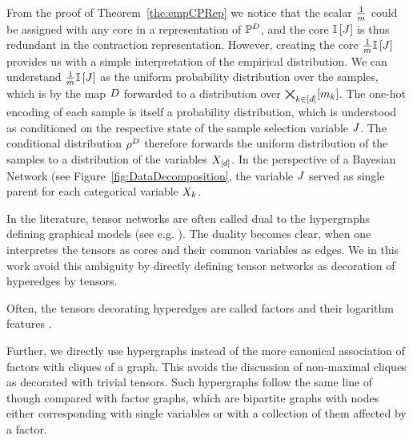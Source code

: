 From the proof of Theorem~\ref{the:empCPRep} we notice that the scalar $\frac{1}{m}$ could be assigned with any core in a representation of $\mathbb{P}^{D}$, and the core $\mathbb{I}\left[J\right]$ is thus redundant in the contraction representation.
However, creating the core $\frac{1}{m}\mathbb{I}\left[J\right]$ provides us with a simple interpretation of the empirical distribution.
We can understand $\frac{1}{m}\mathbb{I}\left[J\right]$ as the uniform probability distribution over the samples, which is by the map $D$ forwarded to a distribution over $\bigtimes_{k\in[d]}[m_{k}]$.
The one-hot encoding of each sample is itself a probability distribution, which is understood as conditioned on the respective state of the sample selection variable $J$.
The conditional distribution $\rho^{D}$ therefore forwards the uniform distribution of the samples to a distribution of the variables $X_{[d]}$.
In the perspective of a Bayesian Network (see Figure~\ref{fig:DataDecomposition}, the variable $J$ served as single parent for each categorical variable $X_{k}$.





\begin{remark}
	In the literature, tensor networks are often called dual to the hypergraphs defining graphical models (see e.g. \cite{robeva_duality_2019}).
	The duality becomes clear, when one interpretes the tensors as cores and their common variables as edges.
	We in this work avoid this ambiguity by directly defining tensor networks as decoration of hyperedges by tensors.
	
	Often, the tensors decorating hyperedges are called factors and their logarithm features \cite{koller_probabilistic_2009}.
	
	Further, we directly use hypergraphs instead of the more canonical association of factors with cliques of a graph.
	This avoids the discussion of non-maximal cliques as decorated with trivial tensors.
	Such hypergraphs follow the same line of though compared with factor graphs, which are bipartite graphs with nodes either corresponding with single variables or with a collection of them affected by a factor.
\end{remark}







